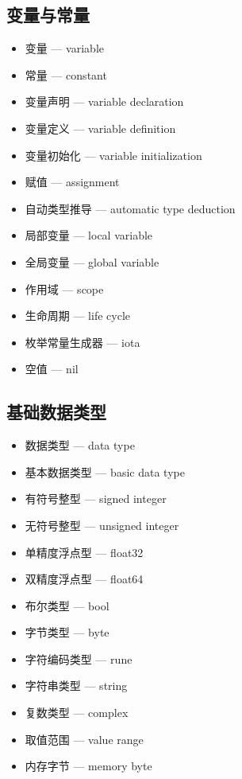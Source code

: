 \subsection{变量与常量}
\begin{itemize}
\item 变量 — variable
\item 常量 — constant
\item 变量声明 — variable declaration
\item 变量定义 — variable definition
\item 变量初始化 — variable initialization
\item 赋值 — assignment
\item 自动类型推导 — automatic type deduction
\item 局部变量 — local variable
\item 全局变量 — global variable
\item 作用域 — scope
\item 生命周期 — life cycle
\item 枚举常量生成器 — iota
\item 空值 — nil
\end{itemize}

\subsection{基础数据类型}
\begin{itemize}
\item 数据类型 — data type
\item 基本数据类型 — basic data type
\item 有符号整型 — signed integer
\item 无符号整型 — unsigned integer
\item 单精度浮点型 — float32
\item 双精度浮点型 — float64
\item 布尔类型 — bool
\item 字节类型 — byte
\item 字符编码类型 — rune
\item 字符串类型 — string
\item 复数类型 — complex
\item 取值范围 — value range
\item 内存字节 — memory byte
\end{itemize}

